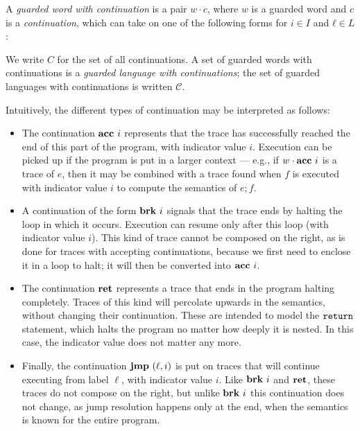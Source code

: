\begin{definition}
 A \emph{guarded word with continuation} is a pair $w ⋅ c$,
 where $w$ is a guarded word and $c$ is a \emph{continuation},
 which can take on one of the following forms for $i ∈ I$ and $ℓ ∈ L$:
 We write $C$ for the set of all continuations.
 A set of guarded words with continuations is a \emph{guarded language with continuations}; the set of guarded languages with continuations is written $𝒞$.
\end{definition}
Intuitively, the different types of continuation may be interpreted as follows:
\begin{itemize}
    \item
    The continuation ${\mathbf{acc} ~ i}$ represents that the trace has successfully reached the end of this part of the program, with indicator value \(i\).
    Execution can be picked up if the program is put in a larger context --- e.g., if $w \cdot {\mathbf{acc} ~ i}$ is a trace of $e$, then it may be combined with a trace found when $f$ is executed with indicator value $i$ to compute the semantics of $e; f$.
    \item
    A continuation of the form $\mathbf{brk} ~ i$ signals that the trace ends by halting the loop in which it occurs.
    Execution can resume only after this loop (with indicator value $i$).
    This kind of trace cannot be composed on the right, as is done for traces with accepting continuations, because we first need to enclose it in a loop to halt; it will then be converted into ${\mathbf{acc} ~ i}$.
    \item
    The continuation ${\mathbf{ret}}$ represents a trace that ends in the program halting completely.
    Traces of this kind will percolate upwards in the semantics, without changing their continuation.
    These are intended to model the $\mathtt{return}$ statement, which halts the program no matter how deeply it is nested.
    In this case, the indicator value does not matter any more.
    \item
    Finally, the continuation ${\mathbf{jmp} ~ (\ell, i)}$ is put on traces that will continue executing from label $\ell$, with indicator value $i$.
    Like $\mathbf{brk} ~ i$ and ${\mathbf{ret}}$, these traces do not compose on the right, but unlike $\mathbf{brk} ~ i$ this continuation does not change, as jump resolution happens only at the end, when the semantics is known for the entire program.
\end{itemize}

